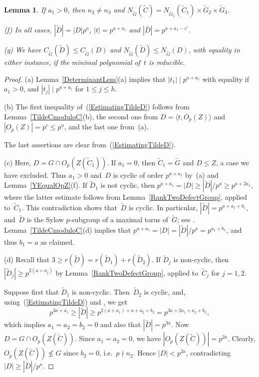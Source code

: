 \documentclass[12pt]{amsart}
\newtheorem{lem}[thm]{Lemma}
\theoremstyle{theorem}
\theoremstyle{definition}
\theoremstyle{remark}
\begin{document}
\begin{lem}
If $a_1 > 0$, then $n_2 \neq n_3$ and $N_{\tilde{G}}( \tilde{C} ) = 
N_{\tilde{G}_1}( \tilde{C}_{1} ) \times \tilde{G}_2 \times \tilde{G}_3$.

{\rm (f)} In all cases, $|\tilde{D}| = |D|p^a$, $|t| = p^{a+a_1}$ and 
$|\bar{D}| = p^{a+a_1-c'}$.

{\rm (g)} We have $C_{\tilde{G}}( \tilde{D} ) \leq C_{\tilde{G}}( D )$ and
$N_{\tilde{G}}( \tilde{D} ) \leq N_{\tilde{G}}( D )$, with equality in either 
instance, if the minimal polynomial of~$t$ is reducible.
\end{lem}
\begin{proof}
(a) Lemma~\ref{DeterminantLem}(a) implies that $|t_1| \mid p^{a + a_1}$ with 
equality if $a_1 > 0$, and $|t_j| \mid p^{a + a_1}$ for $1 \leq j \leq h$. 

(b) The first inequality 
of~(\ref{EstimatingTildeD}) follows from Lemma~\ref{TildeCmoduloC}(b), the
second one from $D = \langle t, O_p(Z) \rangle$ and $|O_p(Z)| = p^c \leq p^a$, 
and the last one from~(a).

The last assertions are clear from~(\ref{EstimatingTildeD}).

(c) Here, $D = G \cap O_p( Z ( \tilde{C}_1 ) )$. If $a_1 = 0$, then
$\tilde{C}_1 = \tilde{G}$ and $D \leq Z$, a case we have excluded. Thus
$a_1 > 0$ and~$D$ is cyclic of order $p^{a+a_1}$ by~(a) and 
Lemma~\ref{YEqualOpZ}(f). If $\tilde{D}_1$ is not cyclic, then 
$p^{a+a_1} = |D| \geq |\tilde{D}|/p^a \geq p^{a+2a_1}$, where the latter 
estimate follows from Lemma~\ref{RankTwoDefectGroup}, applied to~$\tilde{C}_1$. 
This contradiction shows that~$\tilde{D}$ is cyclic. In particular, 
$|\tilde{D}| = p^{a+a_1+b_1}$, and~$\tilde{D}$ is the Sylow $p$-subgroup of a 
maximal torus of~$\tilde{G}$; see \cite[Corollary~$3.6.2$]{HL25}. 
Lemma~\ref{TildeCmoduloC}(d) implies that 
$p^{a+a_1} = |D| = |\tilde{D}|/p^a = p^{a_1+b_1}$, and thus $b_1 = a$ as
claimed.

(d) Recall that $3 \geq r( \tilde{D} ) = r( \tilde{D}_1 ) + r( \tilde{D}_2 )$.
If $\tilde{D}_j$ is non-cyclic, then $|\tilde{D}_j| \geq p^{2(a+a_j)}$
by Lemma~\ref{RankTwoDefectGroup}, applied to~$\tilde{C}_j$ for $j = 1, 2$.

Suppose first that $\tilde{D}_1$ is non-cyclic. Then~$\tilde{D}_2$ is cyclic, 
and, using~(\ref{EstimatingTildeD}) and \cite[Corollary~$3.6.2$]{HL25}, we get
$$p^{3a + a_1} \geq |\tilde{D}| \geq p^{2(a+a_1) + a + a_2 + b_2}
= p^{3a + 2a_1+  a_2 + b_2},$$
which implies $a_1 = a_2 = b_2 = 0$ and also that $|\tilde{D}| = p^{3a}$.
Now $D = G \cap O_p( Z( \tilde{C} ) )$. Since $a_1 = a_2 = 0$, we have
$|O_p( Z( \tilde{C} ) )| = p^{2a}$. Clearly, $O_p( Z( \tilde{C} ) ) \not\leq G$
since $b_2 = 0$, i.e.\ $p \nmid n_2$. Hence $|D| < p^{2a}$, contradicting
$|D| \geq |\tilde{D}|/p^a$.


\end{proof}
\end{document}
